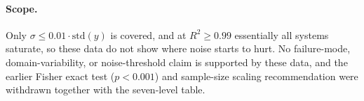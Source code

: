 \documentclass[twoside,11pt]{article}
\newcommand{\Rsq}{R^{2}}
\begin{document}
\paragraph{Scope.} Only $\sigma\leq0.01\cdot\mathrm{std}(y)$ is covered, and at
$\Rsq\geq0.99$ essentially all systems saturate, so these data do not show where
noise starts to hurt. No failure-mode, domain-variability, or noise-threshold claim is supported by
these data, and the earlier Fisher exact test ($p<0.001$) and sample-size
scaling recommendation were withdrawn together with the seven-level table.

\end{document}
